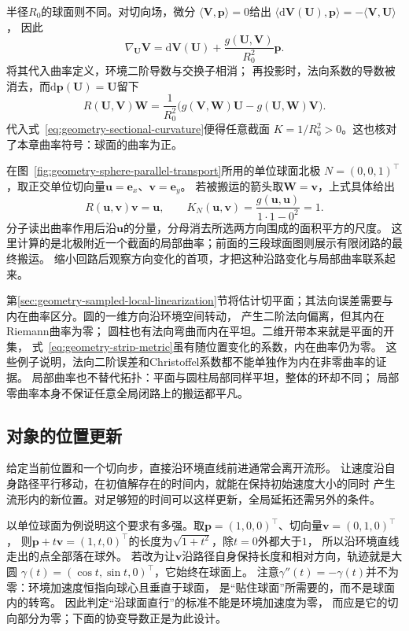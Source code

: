 半径$R_0$的球面则不同。对切向场，微分
$\langle\bm V,\bm p\rangle=0$给出
$\langle\mathrm d\bm V(\bm U),\bm p\rangle=-\langle\bm V,\bm U\rangle$，
因此
\[
 \nabla_{\bm U}\bm V
 =\mathrm d\bm V(\bm U)+\frac{g(\bm U,\bm V)}{R_0^2}\bm p.
\]
将其代入曲率定义，环境二阶导数与交换子相消；
再投影时，法向系数的导数被消去，而$\mathrm d\bm p(\bm U)=\bm U$留下
\[
 R(\bm U,\bm V)\bm W
 =\frac1{R_0^2}\bigl(g(\bm V,\bm W)\bm U-g(\bm U,\bm W)\bm V\bigr).
\]
代入式~\eqref{eq:geometry-sectional-curvature}便得任意截面
$K=1/R_0^2>0$。这也核对了本章曲率符号：球面的曲率为正。

在图~\ref{fig:geometry-sphere-parallel-transport}所用的单位球面北极
$N=(0,0,1)^\top$，取正交单位切向量$\bm u=\bm e_x$、$\bm v=\bm e_y$。
若被搬运的箭头取$\bm W=\bm v$，上式具体给出
\[
 R(\bm u,\bm v)\bm v=\bm u,\qquad
 K_N(\bm u,\bm v)=
 \frac{g(\bm u,\bm u)}{1\cdot1-0^2}=1.
\]
分子读出曲率作用后沿$\bm u$的分量，分母消去所选两方向围成的面积平方的尺度。
这里计算的是北极附近一个截面的局部曲率；前面的三段球面图则展示有限闭路的最终搬运。
缩小回路后观察方向变化的首项，才把这种沿路变化与局部曲率联系起来。

第\ref{sec:geometry-sampled-local-linearization}节将估计切平面；其法向误差需要与内在曲率区分。圆的一维方向沿环境空间转动，
产生二阶法向偏离，但其内在Riemann曲率为零；
圆柱也有法向弯曲而内在平坦。二维开带本来就是平面的开集，
式~\eqref{eq:geometry-strip-metric}虽有随位置变化的系数，内在曲率仍为零。
这些例子说明，法向二阶误差和Christoffel系数都不能单独作为内在非零曲率的证据。
局部曲率也不替代拓扑：平面与圆柱局部同样平坦，整体的环却不同；
局部零曲率本身不保证任意全局闭路上的搬运都平凡。

\subsection{对象的位置更新}
\label{sec:geometry-position-updates}
\label{sec:geometry-geodesic-motion-minimization}

\label{sec:geometry-geodesic-motion}

给定当前位置和一个切向步，直接沿环境直线前进通常会离开流形。
让速度沿自身路径平行移动，在初值解存在的时间内，就能在保持初始速度大小的同时
产生流形内的新位置。对足够短的时间可以这样更新，全局延拓还需另外的条件。

以单位球面为例说明这个要求有多强。取$\bm p=(1,0,0)^\top$、切向量$\bm v=(0,1,0)^\top$，
则$\bm p+t\bm v=(1,t,0)^\top$的长度为$\sqrt{1+t^2}$，除$t=0$外都大于$1$，
所以沿环境直线走出的点全部落在球外。
若改为让$\bm v$沿路径自身保持长度和相对方向，轨迹就是大圆
$\gamma(t)=(\cos t,\sin t,0)^\top$，它始终在球面上。
注意$\gamma''(t)=-\gamma(t)$并不为零：环境加速度恒指向球心且垂直于球面，
是“贴住球面”所需要的，而不是球面内的转弯。
因此判定“沿球面直行”的标准不能是环境加速度为零，
而应是它的切向部分为零；下面的协变导数正是为此设计。


